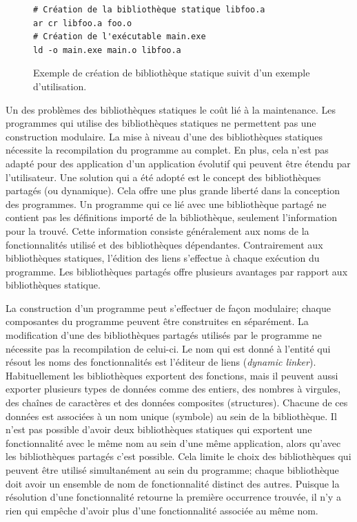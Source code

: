 \begin{figure}[ht]
    \begin{minipage}[t]{0.5\textwidth}
\begin{verbatim}
# Création de la bibliothèque statique libfoo.a
ar cr libfoo.a foo.o
# Création de l'exécutable main.exe
ld -o main.exe main.o libfoo.a
\end{verbatim}
    \end{minipage}

    \caption{Exemple de création de bibliothèque statique suivit d'un exemple
    d'utilisation.}
\end{figure}

Un des problèmes des bibliothèques statiques le coût lié à la maintenance.  Les
programmes qui utilise des bibliothèques statiques ne permettent pas une
construction modulaire. La mise à niveau d'une des bibliothèques statiques
nécessite la recompilation du programme au complet. En plus, cela n'est pas
adapté pour des application d'un application évolutif qui peuvent être étendu
par l'utilisateur. Une solution qui a été adopté est le
concept des bibliothèques partagés (ou dynamique). Cela offre une plus grande
liberté dans la conception des programmes. Un programme qui ce lié avec une
bibliothèque partagé ne contient pas les définitions importé de la
bibliothèque, seulement l'information pour la trouvé. Cette information
consiste généralement aux noms de la fonctionnalités utilisé et des
bibliothèques dépendantes. Contrairement aux bibliothèques statiques,
l'édition des liens s'effectue à chaque exécution du programme.
Les bibliothèques partagés offre plusieurs avantages par rapport
aux bibliothèques statique.

La construction d'un programme peut s'effectuer de façon modulaire; chaque
composantes du programme peuvent être construites en séparément.  La
modification d'une des bibliothèques partagés utilisés par
le programme ne nécessite pas la recompilation de celui-ci. Le nom qui est
donné à l'entité qui résout les noms des fonctionnalités est l'éditeur de liens (\textit{dynamic linker}).
Habituellement les bibliothèques exportent des fonctions, mais il peuvent aussi
exporter plusieurs types de données comme des entiers, des nombres à virgules,
des chaînes de caractères et des données composites (structures). Chacune de ces données est
associées à un nom unique (symbole) au sein de la bibliothèque.
Il n'est pas possible d'avoir deux bibliothèques statiques qui exportent une
fonctionnalité avec le même nom au sein d'une même application, alors qu'avec
les bibliothèques partagés c'est possible. Cela limite le choix des
bibliothèques qui peuvent être utilisé simultanément au sein du programme;
chaque bibliothèque doit avoir un ensemble de nom de fonctionnalité distinct
des autres. Puisque la résolution d'une fonctionnalité retourne la première
occurrence trouvée, il n'y a rien qui empêche d'avoir plus d'une fonctionnalité
associée au même nom.

